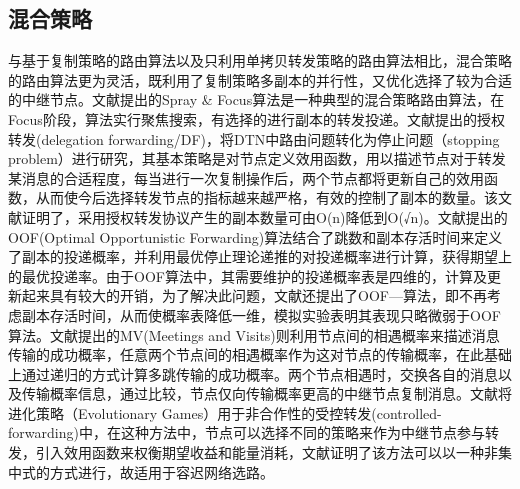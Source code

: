 \subsection{混合策略}

与基于复制策略的路由算法以及只利用单拷贝转发策略的路由算法相比，混合策略的路由算法更为灵活，既利用了复制策略多副本的并行性，又优化选择了较为合适的中继节点。文献\cite{Spyropoulos2007a}提出的Spray \& Focus算法是一种典型的混合策略路由算法，在Focus阶段，算法实行聚焦搜索，有选择的进行副本的转发投递。文献\cite{Erramilli2008}提出的授权转发(delegation forwarding/DF)，将DTN中路由问题转化为停止问题（stopping problem）进行研究，其基本策略是对节点定义效用函数，用以描述节点对于转发某消息的合适程度，每当进行一次复制操作后，两个节点都将更新自己的效用函数，从而使今后选择转发节点的指标越来越严格，有效的控制了副本的数量。该文献证明了，采用授权转发协议产生的副本数量可由O(n)降低到O(√n)。文献\cite{Liu2009}提出的OOF(Optimal Opportunistic Forwarding)算法结合了跳数和副本存活时间来定义了副本的投递概率，并利用最优停止理论递推的对投递概率进行计算，获得期望上的最优投递率。由于OOF算法中，其需要维护的投递概率表是四维的，计算及更新起来具有较大的开销，为了解决此问题，文献\cite{Liu2009}还提出了OOF—算法，即不再考虑副本存活时间，从而使概率表降低一维，模拟实验表明其表现只略微弱于OOF算法。文献\cite{Burns:2005gi}提出的MV(Meetings and Visits)则利用节点间的相遇概率来描述消息传输的成功概率，任意两个节点间的相遇概率作为这对节点的传输概率，在此基础上通过递归的方式计算多跳传输的成功概率。两个节点相遇时，交换各自的消息以及传输概率信息，通过比较，节点仅向传输概率更高的中继节点复制消息。文献\cite{El-Azouzi2013}将进化策略（Evolutionary Games）用于非合作性的受控转发(controlled-forwarding)中，在这种方法中，节点可以选择不同的策略来作为中继节点参与转发，引入效用函数来权衡期望收益和能量消耗，文献\cite{El-Azouzi2013}证明了该方法可以以一种非集中式的方式进行，故适用于容迟网络选路。



